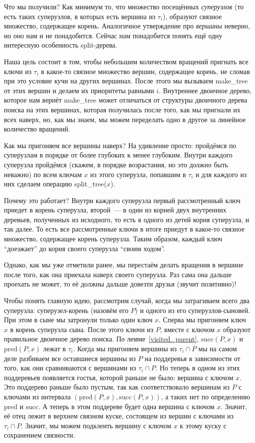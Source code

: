 Что мы получили? Как минимум то, что множество посещённых \emph{суперузлов} (то есть таких суперузлов, в которых есть вершина из $\tau_i$), образуют связное множество, содержащее корень. Аналогичное утверждение про \emph{вершины} неверно, но оно нам и не понадобится. Сейчас нам понадобится понять ещё одну интересную особенность split-дерева.

Наша цель состоит в том, чтобы небольшим количеством вращений пригнать все
ключи из $\tau_i$ в какое-то связное множество вершин, содержащее корень, 
не сломав при это условие кучи на других вершинах.
После этого мы вызываем \textrm{make\_tree} от этих вершин и делаем их приоритеты
равными $i$. Внутреннее двоичное дерево, которое нам вернёт \textrm{make\_tree}
может отличаться от структуры двоичного дерева поиска на этих вершинах, которая получилась после того, как мы пригнали их всех наверх, но, как мы знаем, мы можем переделать одно в другое за линейное количество вращений.

Как мы пригоняем все вершины наверх? На удивление просто: пройдёмся по суперузлам в порядке от более глубоких к менее глубоким. Внутри каждого суперузла пройдёмся (скажем, в порядке возрастания, но это должно быть неважно) по всем ключам $x$ из этого суперузла, попавшим в $\tau_i$ и для каждого из них сделаем операцию 
\textrm{split\_tree}($x$). 

Почему это работает? Внутри каждого суперузла первый рассмотренный ключ приедет в корень суперузла, второй~--- в один из корней двух внутренних деревьев, полученных из исходного, то есть в одного из детей корня суперузла, и так далее. То есть все рассмотренные ключи в итоге приедут в какое-то связное множество, содержащее корень суперузла. Таким образом, каждый ключ ``доезжает'' до корня своего суперузла ``своим ходом''.

Однако, как мы уже отметили ранее, мы перестаём делать вращения в вершине после того, как она приехала наверх своего суперузла. Раз сама она дальше проехать не может, то её должны
дальше довезти друзья (звучит позитивно)! 

Чтобы понять главную идею, рассмотрим случай, когда мы затрагиваем всего два суперузла: суперузел-корень (назовём его $P$) и одного из его суперузлов-сыновей. При этом в сыне мы затронули только один ключ $x$. Сперва мы пригоняем ключ $x$ в корень суперузла сына.
После этого ключи из $P$, вместе с ключом $x$ образуют правильное двоичное дерево поиска.
По лемме~\ref{visited_parent}, $\mathrm{succ}(P, x)$ и $\mathrm{pred}(P, x)$ лежат в $\tau_i$. Когда мы пригоняем вершины из $\tau_i \cap P$ мы на самом деле разбиваем все оставшиеся вершины из $P$ на поддеревья в зависимости от того, как они сравниваются с вершинами из $\tau_i \cap P$. Но теперь в одном из этих поддеревьев появляется гостья, которой раньше не было: вершина с ключом $x$. Это поддерево раньше было пустым, так как соответствовало вершинам из $P$ с ключами из интервала $(\mathrm{pred}(P, x), \mathrm{succ}(P, x))$, а таких нет по определению $\mathrm{pred}$ и $\mathrm{succ}$. А теперь в этом поддереве будет одна вершина с ключом $x$. Значит, её отец лежит в верхнем связном куске, состоящем из вершин с ключами из $\tau_i \cap P$. Значит, мы можем подклеить вершину с ключом $x$ к этому куску с сохранением связности. 

